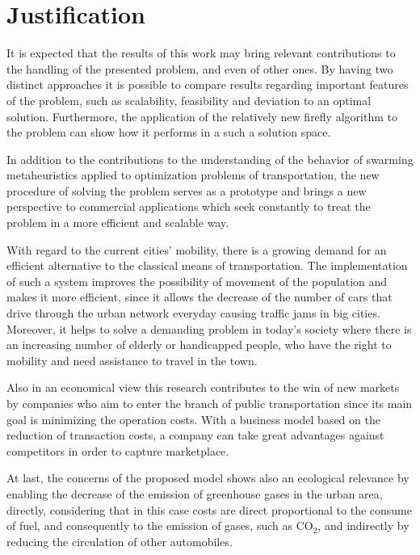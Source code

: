 \documentclass[tuberlin,cic,tc,openright,english,noabntcite,oneside]{iiufrgs}
\begin{document}
\section{Justification}
It is expected that the results of this work may bring relevant contributions to the handling of the presented problem, and even of other ones. By having two distinct approaches it is possible to compare results regarding important features of the problem, such as scalability, feasibility and deviation to an optimal solution. Furthermore, the application of the relatively new firefly algorithm to the problem can show how it performs in a such a solution space.

In addition to the contributions to the understanding of the behavior of swarming metaheuristics applied to optimization problems of transportation, the new procedure of solving the problem serves as a prototype and brings a new perspective to commercial applications which seek constantly to treat the problem in a more efficient and scalable way.

With regard to the current cities' mobility, there is a growing demand for an efficient alternative to the classical means of transportation. The implementation of such a system improves the possibility of movement of the population and makes it more efficient, since it allows the decrease of the number of cars that drive through the urban network everyday causing traffic jams in big cities. Moreover, it helps to solve a demanding problem in today's society where there is an increasing number of elderly or handicapped people, who have the right to mobility and need assistance to travel in the town.

Also in an economical view this research contributes to the win of new markets by companies who aim to enter the branch of public transportation since its main goal is minimizing the operation costs. With a business model based on the reduction of transaction costs, a company can take great advantages against competitors in order to capture marketplace.

At last, the concerns of the proposed model shows also an ecological relevance by enabling the decrease of the emission of greenhouse gases in the urban area, directly, considering that in this case costs are direct proportional to the consume of fuel, and consequently to the emission of gases, such as CO$_{2}$, and indirectly by reducing the circulation of other automobiles.
\end{document}
